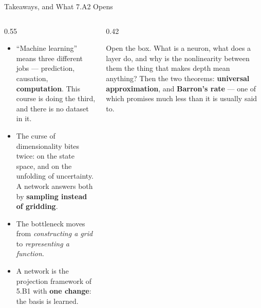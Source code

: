 \begin{frame}{Takeaways, and What 7.A2 Opens}
\begin{columns}[T]
\begin{column}{0.55\textwidth}
\begin{takeawaybox}\small
\begin{itemize}\small\setlength{\itemsep}{1.2mm}
  \item ``Machine learning'' means three different jobs --- prediction, causation, \textbf{computation}. This course is doing the third, and there is no dataset in it.
  \item The curse of dimensionality bites twice: on the state space, and on the unfolding of uncertainty. A network answers both by \textbf{sampling instead of gridding}.
  \item The bottleneck moves from \emph{constructing a grid} to \emph{representing a function}.
  \item A network is the projection framework of 5.B1 with \textbf{one change}: the basis is learned.
\end{itemize}
\end{takeawaybox}
\end{column}
\begin{column}{0.42\textwidth}
\begin{conceptbox}[title=\textbf{Bridge to 7.A2}]\small
Open the box. What is a neuron, what does a layer do, and why is the nonlinearity between them the thing that makes depth mean anything?
\medskip
Then the two theorems: \textbf{universal approximation}, and \textbf{Barron's rate} --- one of which promises much less than it is usually said to.
\end{conceptbox}
\end{column}
\end{columns}
\end{frame}


